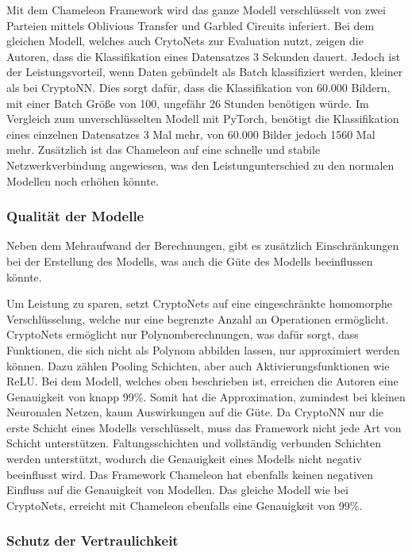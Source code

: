 Mit dem Chameleon Framework \cite{P-72} wird das ganze Modell verschlüsselt von zwei Parteien mittels Oblivious Transfer und Garbled Circuits inferiert.
Bei dem gleichen Modell, welches auch CrytoNets zur Evaluation nutzt, zeigen die Autoren, dass die Klassifikation eines Datensatzes 3 Sekunden dauert.
Jedoch ist der Leistungsvorteil, wenn Daten gebündelt als Batch klassifiziert werden, kleiner als bei CryptoNN.
Dies sorgt dafür, dass die Klassifikation von 60.000 Bildern, mit einer Batch Größe von 100, ungefähr 26 Stunden benötigen würde.
Im Vergleich zum unverschlüsselten Modell mit PyTorch, benötigt die Klassifikation eines einzelnen Datensatzes 3 Mal mehr, von 60.000 Bilder jedoch 1560 Mal mehr.
Zusätzlich ist das Chameleon auf eine schnelle und stabile Netzwerkverbindung angewiesen, was den Leistungunterschied zu den normalen Modellen noch erhöhen könnte.

\subsubsection*{Qualität der Modelle}

Neben dem Mehraufwand der Berechnungen, gibt es zusätzlich Einschränkungen bei der Erstellung des Modells, was auch die Güte des Modells beeinflussen könnte.

Um Leistung zu sparen, setzt CryptoNets \cite{P-54} auf eine eingeschränkte homomorphe Verschlüsselung, welche nur eine begrenzte Anzahl an Operationen ermöglicht.
CryptoNets ermöglicht nur Polynomberechnungen, was dafür sorgt, dass Funktionen, die sich nicht als Polynom abbilden lassen, nur approximiert werden können.
Dazu zählen Pooling Schichten, aber auch Aktivierungsfunktionen wie ReLU.
Bei dem Modell, welches oben beschrieben ist, erreichen die Autoren eine Genauigkeit von knapp 99\%.
Somit hat die Approximation, zumindest bei kleinen Neuronalen Netzen, kaum Auswirkungen auf die Güte.
Da CryptoNN \cite{P-53} nur die erste Schicht eines Modells verschlüsselt, muss das Framework nicht jede Art von Schicht unterstützen.
Faltungsschichten und vollständig verbunden Schichten werden unterstützt, wodurch die Genauigkeit eines Modells nicht negativ beeinflusst wird.
Das Framework Chameleon \cite{P-72} hat ebenfalls keinen negativen Einfluss auf die Genauigkeit von Modellen.
Das gleiche Modell wie bei CryptoNets, erreicht mit Chameleon ebenfalls eine Genauigkeit von 99\%.

\subsubsection*{Schutz der Vertraulichkeit}

